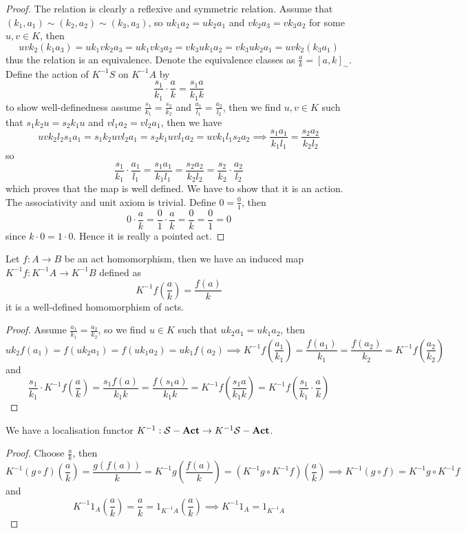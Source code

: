 \begin{proof}[Proof]
    The relation is clearly a reflexive and symmetric relation. Assume 
    that $(k_1,a_1)\sim(k_2,a_2)\sim(k_3,a_3)$, so 
    $uk_1a_2 = uk_2a_1$ and $vk_2a_3 = vk_3a_2$ for some $u,v\in K$, then 
    \[
        uvk_2(k_1a_3) = uk_1vk_2a_3 = uk_1vk_3a_2 = vk_3uk_1a_2 = vk_3uk_2a_1 = uvk_2(k_3a_1)
    \] 
    thus the relation is an equivalence. Denote the equivalence classes as $\frac{a}{k} = [a,k]_\sim$. 
    Define the action of $K^{-1}S$ on $K^{-1}A$ by 
    \[
        \frac{s_1}{k_1}\cdot\frac{a}{k} = \frac{s_1 a}{k_1 k}
    \]
    to show well-definedness assume $\frac{s_1}{k_1}=\frac{s_2}{k_2}$ and $\frac{a_1}{l_1}=\frac{a_2}{l_2}$, then 
    we find $u,v\in K$ such that $s_1k_2u = s_2k_1u$ and $vl_1a_2 = vl_2a_1$, then we have 
    \[
        uvk_2l_2s_1a_1 = s_1k_2uvl_2a_1 = s_2k_1uvl_1a_2 = uvk_1l_1s_2a_2 \implies \frac{s_1a_1}{k_1l_1} = \frac{s_2a_2}{k_2l_2}
    \]
    so 
    \[
        \frac{s_1}{k_1}\cdot\frac{a_1}{l_1} = \frac{s_1a_1}{k_1l_1} = \frac{s_2a_2}{k_2l_2} = \frac{s_2}{k_2}\cdot\frac{a_2}{l_2}
    \]
    which proves that the map is well defined. We have to show that it is an action. 
    The associativity and unit axiom is trivial. Define $0 = \frac{0}{1}$, then 
    \[
        0\cdot\frac{a}{k} = \frac{0}{1}\cdot \frac{a}{k} = \frac{0}{k} = \frac{0}{1} = 0
    \]
    since $k\cdot 0 = 1\cdot 0$. Hence it is really a pointed act. 
\end{proof}
\begin{proposition}
    Let $f: A\to B$ be an act homomorphism, then we have an induced 
    map $K^{-1}f : K^{-1}A \to K^{-1}B$ defined as 
    \[
        K^{-1}f\left(\frac{a}{k}\right) = \frac{f(a)}{k}
    \] 
    it is a well-defined homomorphism of acts.
\end{proposition}
\begin{proof}[Proof]
    Assume $\frac{a_1}{k_1}=\frac{a_2}{k_2}$, so we find $u\in K$ such that 
    $uk_2a_1= uk_1a_2$, then 
    \[
        uk_2f(a_1) = f(uk_2a_1) = f(uk_1a_2) = uk_1f(a_2) \implies K^{-1}f\left(\frac{a_1}{k_1}\right)=\frac{f(a_1)}{k_1}=\frac{f(a_2)}{k_2} = K^{-1}f\left(\frac{a_2}{k_2}\right)
    \]
    and 
    \[
    \frac{s_1}{k_1}\cdot K^{-1}f\left(\frac{a}{k}\right) = \frac{s_1f(a)}{k_1k} = \frac{f(s_1a)}{k_1k} = 
    K^{-1}f\left(\frac{s_1a}{k_1k}\right) = K^{-1}f\left(\frac{s_1}{k_1}\cdot\frac{a}{k}\right)
    \]
\end{proof}
\begin{proposition}
    We have a localisation functor $K^{-1}:\mathcal{S}-\mathrm{\textbf{Act}}\to K^{-1}\mathcal{S}-\mathrm{\textbf{Act}}$.
\end{proposition}
\begin{proof}[Proof]
    Choose $\frac{a}{k}$, then
    \[
    K^{-1}(g\circ f)\left(\frac{a}{k}\right) = \frac{g(f(a))}{k} = K^{-1}g\left(\frac{f(a)}{k}\right) = (K^{-1}g\circ K^{-1}f)(\frac{a}{k}) \implies K^{-1}(g\circ f) = K^{-1}g\circ K^{-1}f
    \]
    and 
    \[
        K^{-1}1_A\left(\frac{a}{k}\right) = \frac{a}{k} = 1_{K^{-1}A}(\frac{a}{k}) \implies K^{-1}1_A = 1_{K^{-1}A}
    \]
\end{proof}
